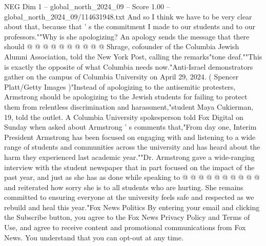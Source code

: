 \begin{textsample}{NEG Dim 1 – global\_north\_2024\_09 – Score 1.00 – global\_north\_2024\_09/114631948.txt}
And so I think we have to be very clear about that, because that ' s the commitment I made to our students and to our professors.""Why is she apologizing?
An apology sends the message that there should @ @ @ @ @ @ @ @ @ @ Shrage, cofounder of the Columbia Jewish Alumni Association, told the New York Post, calling the remarks"tone deaf.""This is exactly the opposite of what Columbia needs now."Anti-Israel demonstrators gather on the campus of Columbia University on April 29, 2024. ( Spencer Platt/Getty Images )"Instead of apologizing to the antisemitic protesters, Armstrong should be apologizing to the Jewish students for failing to protect them from relentless discrimination and harassment,"student Maya Cukierman, 19, told the outlet.
A Columbia University spokesperson told Fox Digital on Sunday when asked about Armstrong ' s comments that,"From day one, Interim President Armstrong has been focused on engaging with and listening to a wide range of students and communities across the university and has heard about the harm they experienced last academic year.""Dr.
Armstrong gave a wide-ranging interview with the student newspaper that in part focused on the impact of the past year, and just as she has as done while speaking to @ @ @ @ @ @ @ @ @ @ and reiterated how sorry she is to all students who are hurting.
She remains committed to ensuring everyone at the university feels safe and respected as we rebuild and heal this year."Fox News Politics By entering your email and clicking the Subscribe button, you agree to the Fox News Privacy Policy and Terms of Use, and agree to receive content and promotional communications from Fox News.
You understand that you can opt-out at any time.

\end{textsample}
